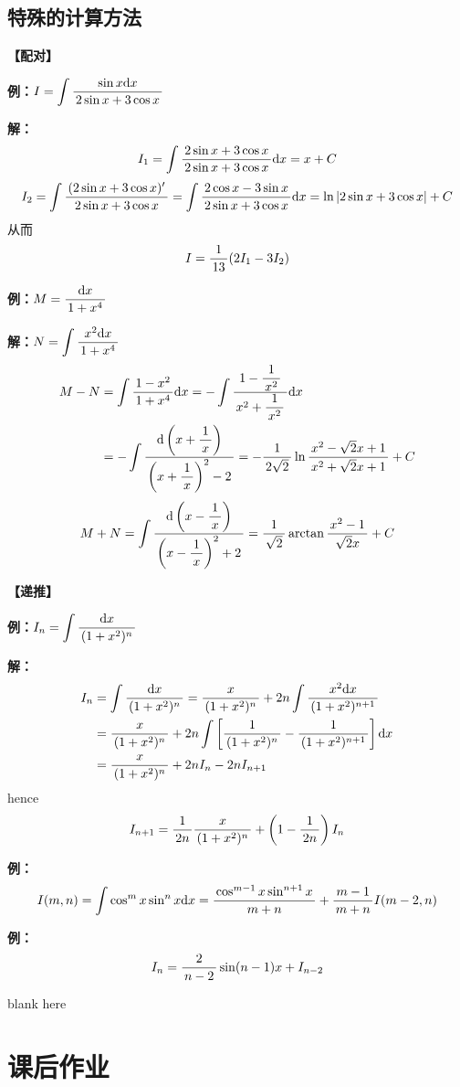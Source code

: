 \begin{shaded}

\section*{特殊的计算方法}

{\bf 【配对】}

{\bf 例：}$I=\dint\df{\sin x\d x}{2\sin x+3\cos x}$

{\bf 解：}
$$I_1=\dint\df{2\sin x+3\cos x}{2\sin x+3\cos x}\d x=x+C$$
$$I_2=\dint\df{(2\sin x+3\cos x)'}{2\sin x+3\cos x}
=\dint\df{2\cos x-3\sin x}{2\sin x+3\cos x}\d x=\ln|2\sin x+3\cos x|+C$$
从而
$$I=\df1{13}(2I_1-3I_2)$$

{\bf 例：}$M=\df{\d x}{1+x^4}$

{\bf 解：}$N=\dint\df{x^2\d x}{1+x^4}$
\begin{align}
M-N&=\dint\df{1-x^2}{1+x^4}\d x=-\dint\df{1-\df1{x^2}}{x^2+\df1{x^2}}\d
x\notag\\
&=-\dint\df{\d\left(x+\df1x\right)}{\left(x+\df1x\right)^2-2}
=-\df1{2\sqrt2}\ln\df{x^2-\sqrt2x+1}{x^2+\sqrt2x+1}+C\notag
\end{align}
$$M+N=\dint\df{\d\left(x-\df1x\right)}{\left(x-\df1x\right)^2+2}
=\df1{\sqrt2}\arctan\df{x^2-1}{\sqrt2x}+C$$

{\bf 【递推】}

{\bf 例：}$I_n=\dint\df{\d x}{(1+x^2)^n}$

{\bf 解：}
\begin{align}
I_n&=\dint\df{\d x}{(1+x^2)^n}=\df x{(1+x^2)^n}+2n\dint\df{x^2\d x}
{(1+x^2)^{n+1}}\notag\\
&=\df x{(1+x^2)^n}+2n\dint\left[\df1{(1+x^2)^n}-
\df1{(1+x^2)^{n+1}}\right]\d x\notag\\
&=\df x{(1+x^2)^n}+2nI_n-2nI_{n+1}\notag
\end{align}
hence
$$I_{n+1}=\df1{2n}\df x{(1+x^2)^n}+\left(1-\df1{2n}\right)I_n$$

{\bf 例：}
$$I(m,n)=\dint\cos^mx\sin^nx\d x=
\df{\cos^{m-1}x\sin^{n+1}x}{m+n}+\df{m-1}{m+n}I(m-2,n)$$

{\bf 例：}
$$I_n=\df2{n-2}\sin(n-1)x+I_{n-2}$$
\end{shaded}

\newpage

blank here

\newpage

\section*{课后作业}

